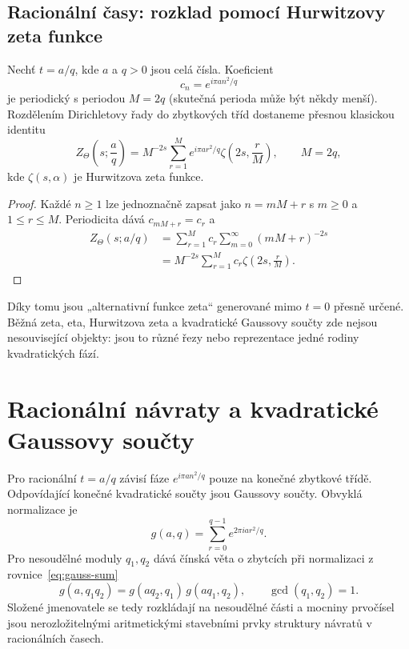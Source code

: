 \subsection{Racionální časy: rozklad pomocí Hurwitzovy zeta funkce}

Nechť $t=a/q$, kde $a$ a $q>0$ jsou celá čísla. Koeficient
\begin{equation}
 c_n=e^{i\pi a n^2/q}
\end{equation}
je periodický s periodou $M=2q$ (skutečná perioda může být někdy menší).
Rozdělením Dirichletovy řady do zbytkových tříd dostaneme přesnou klasickou
identitu
\begin{equation}
 \boxed{
 Z_\Theta\!\left(s;\frac aq\right)
 =M^{-2s}\sum_{r=1}^{M}
 e^{i\pi a r^2/q}
 \zeta\!\left(2s,\frac rM\right),
 \qquad M=2q,}
 \label{eq:rational-hurwitz}
\end{equation}
kde $\zeta(s,\alpha)$ je Hurwitzova zeta funkce.

\begin{proof}
Každé $n\ge1$ lze jednoznačně zapsat jako $n=mM+r$ s $m\ge0$ a $1\le r\le M$.
Periodicita dává $c_{mM+r}=c_r$ a
\begin{align*}
 Z_\Theta(s;a/q)
 &=\sum_{r=1}^{M}c_r\sum_{m=0}^{\infty}(mM+r)^{-2s}\\
 &=M^{-2s}\sum_{r=1}^{M}c_r
   \zeta\!\left(2s,\frac rM\right).
\end{align*}
\end{proof}

Díky tomu jsou „alternativní funkce zeta“ generované mimo $t=0$ přesně určené.
Běžná zeta, eta, Hurwitzova zeta a kvadratické Gaussovy součty zde nejsou
nesouvisející objekty: jsou to různé řezy nebo reprezentace jedné rodiny
kvadratických fází.

\section{Racionální návraty a kvadratické Gaussovy součty}
\label{sec:gauss-revivals}

Pro racionální $t=a/q$ závisí fáze $e^{i\pi a n^2/q}$ pouze na konečné zbytkové
třídě. Odpovídající konečné kvadratické součty jsou Gaussovy součty. Obvyklá
normalizace je
\begin{equation}
 g(a,q)=\sum_{r=0}^{q-1}e^{2\pi i a r^2/q}.
 \label{eq:gauss-sum}
\end{equation}
Pro nesoudělné moduly $q_1,q_2$ dává čínská věta o zbytcích při normalizaci z
rovnice~\eqref{eq:gauss-sum}
\begin{equation}
 g(a,q_1q_2)=g(aq_2,q_1)\,g(aq_1,q_2),
 \qquad \gcd(q_1,q_2)=1.
 \label{eq:gauss-crt}
\end{equation}
Složené jmenovatele se tedy rozkládají na nesoudělné části a mocniny prvočísel
jsou nerozložitelnými aritmetickými stavebními prvky struktury návratů v
racionálních časech.

